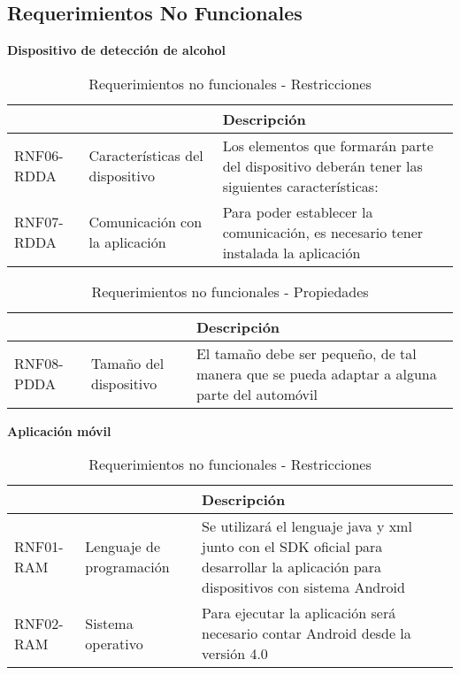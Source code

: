 \subsection{Requerimientos No Funcionales} 
  
\textbf{Dispositivo de detección de alcohol}
\begin{center}
\begin{table}[!htb]
\centering
\begin{tabular}{|p{4cm}|p{4cm}|p{5cm}|}
    \hline
    \centering {\bfseries }  & \centering {\bfseries Nombre} & {\bfseries Descripción} \\ \hline
    \centering RNF06-RDDA & \centering Características del dispositivo & Los elementos que formarán parte del dispositivo deberán tener las siguientes características: \\ \hline
    \centering RNF07-RDDA & \centering Comunicación con la aplicación & Para poder establecer la comunicación, es necesario tener instalada la aplicación \\ \hline
\end{tabular}
\caption{Requerimientos no funcionales - Restricciones}
\label{tabla:pobconlimsincolo}
\end{table}
\end{center}

\begin{center}
\begin{table}[!htb]
\centering
\begin{tabular}{|p{4cm}|p{4cm}|p{5cm}|}
    \hline
    \centering {\bfseries }  & \centering {\bfseries Nombre} & {\bfseries Descripción} \\ \hline
    \centering RNF08-PDDA & \centering Tamaño del dispositivo & El tamaño debe ser pequeño, de tal manera que se pueda adaptar a alguna parte del automóvil \\ \hline
\end{tabular}
\caption{Requerimientos no funcionales - Propiedades}
\label{tabla:pobconlimsincolo}
\end{table}
\end{center}

\textbf{Aplicación móvil}
\begin{center}
\begin{table}[!htb]
\centering
\begin{tabular}{|p{4cm}|p{4cm}|p{5cm}|}
    \hline
    \centering {\bfseries }  & \centering {\bfseries Nombre} & {\bfseries Descripción} \\ \hline
    \centering RNF01-RAM & \centering Lenguaje de programación & Se utilizará el lenguaje java y xml junto con el SDK oficial para desarrollar la aplicación para dispositivos con sistema Android \\ \hline
    \centering RNF02-RAM & \centering Sistema operativo & Para ejecutar la aplicación será necesario contar Android desde la versión 4.0\\ \hline
\end{tabular}
\caption{Requerimientos no funcionales - Restricciones}
\label{tabla:pobconlimsincolo}
\end{table}
\end{center}
    

